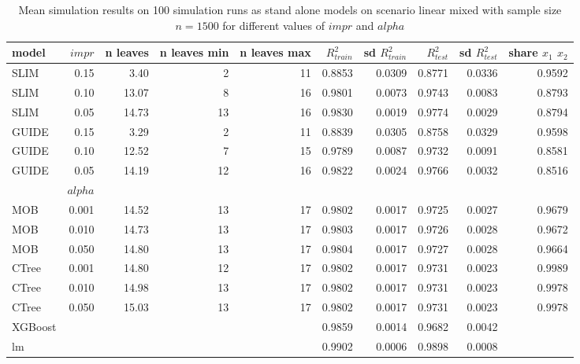 \begin{table}[!htb]
\centering \tiny
\begin{tabular}[t]{l|r|r|r|r|r|r|r|r|r}
\hline

model & $impr$  & n leaves & n leaves min & n leaves max & $R^2_{train}$ & sd $R^2_{train}$ & $R^2_{test}$ & sd $R^2_{test}$ & share $x_1$ $x_2$\\
\hline

SLIM & 0.15 & 3.40 & 2 & 11 & 0.8853 & 0.0309 & 0.8771 & 0.0336 & 0.9592\\
SLIM & 0.10 & 13.07 & 8 & 16 & 0.9801 & 0.0073 & 0.9743 & 0.0083 & 0.8793\\
SLIM & 0.05 & 14.73 & 13 & 16 & 0.9830 & 0.0019 & 0.9774 & 0.0029 & 0.8794\\
GUIDE & 0.15 & 3.29 & 2 & 11 & 0.8839 & 0.0305 & 0.8758 & 0.0329 & 0.9598\\
GUIDE & 0.10 & 12.52 & 7 & 15 & 0.9789 & 0.0087 & 0.9732 & 0.0091 & 0.8581\\
GUIDE & 0.05 & 14.19 & 12 & 16 & 0.9822 & 0.0024 & 0.9766 & 0.0032 & 0.8516\\

\hline

& $alpha$ & & & & & & & \\
\hline

MOB & 0.001 & 14.52 & 13 & 17 & 0.9802 & 0.0017 & 0.9725 & 0.0027 & 0.9679\\
MOB & 0.010 & 14.73 & 13 & 17 & 0.9803 & 0.0017 & 0.9726 & 0.0028 & 0.9672\\
MOB & 0.050 & 14.80 & 13 & 17 & 0.9804 & 0.0017 & 0.9727 & 0.0028 & 0.9664\\

CTree & 0.001 & 14.80 & 12 & 17 & 0.9802 & 0.0017 & 0.9731 & 0.0023 & 0.9989\\
CTree & 0.010 & 14.98 & 13 & 17 & 0.9802 & 0.0017 & 0.9731 & 0.0023 & 0.9978\\
CTree & 0.050 & 15.03 & 13 & 17 & 0.9802 & 0.0017 & 0.9731 & 0.0023 & 0.9978\\
\hline

XGBoost & & & & & 0.9859 & 0.0014 & 0.9682 & 0.0042 &\\
lm & & & & & 0.9902 & 0.0006 & 0.9898 & 0.0008 &\\
\hline

\end{tabular}
\caption{Mean simulation results on 100 simulation runs as stand alone models on scenario linear mixed with sample size $n = 1500$ for different values of $impr$ and $alpha$}
\label{tab:linear_mixed_summary}
\end{table}

